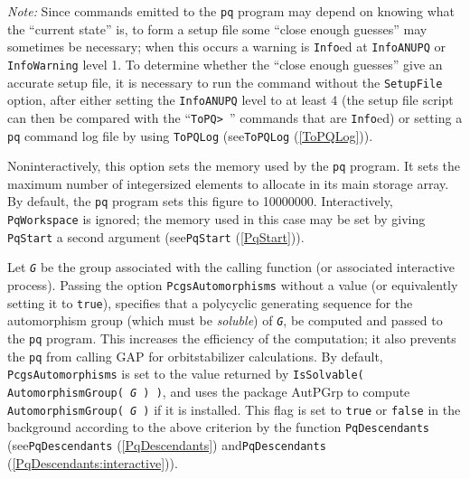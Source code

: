 \documentclass[a4paper,11pt]{report}
\begin{document}
{{\begin{description}
 \emph{Note:} Since commands emitted to the \texttt{pq} program may depend on knowing what the ``current state'' is, to form a setup file some ``close enough guesses'' may sometimes be necessary; when this occurs a warning is \texttt{Info}\texttt{}ed at \texttt{InfoANUPQ} or \texttt{InfoWarning} level 1. To determine whether the ``close enough guesses'' give an accurate setup file, it is necessary to run the command without the \texttt{SetupFile} option, after either setting the \texttt{InfoANUPQ} level to at least 4 (the setup file script can then be compared with the ``\texttt{ToPQ{\textgreater} }'' commands that are \texttt{Info}\texttt{}ed) or setting a \texttt{pq} command log file by using \texttt{ToPQLog} (see{\nobreakspace}\texttt{ToPQLog} (\ref{ToPQLog})). 
\item[{\texttt{PqWorkspace := \mbox{\texttt{\mdseries\slshape workspace}}} \label{option PqWorkspace}\index{option PqWorkspace}}]  Non\texttt{}interactively, this option sets the memory used by the \texttt{pq} program. It sets the maximum number of integer\texttt{}sized
elements to allocate in its main storage array. By default, the \texttt{pq} program sets this figure to 10000000. Interactively, \texttt{PqWorkspace} is ignored; the memory used in this case may be set by giving \texttt{PqStart} a second argument (see{\nobreakspace}\texttt{PqStart} (\ref{PqStart})). 
\item[{\texttt{PcgsAutomorphisms} \label{option PcgsAutomorphisms}\index{option PcgsAutomorphisms}}] 
\item[{\texttt{PcgsAutomorphisms := false}  }]  Let \mbox{\texttt{\mdseries\slshape G}} be the group associated with the calling function (or associated interactive
process). Passing the option \texttt{PcgsAutomorphisms} without a value (or equivalently setting it to \texttt{true}), specifies that a polycyclic generating sequence for the automorphism group
(which must be \emph{soluble}) of \mbox{\texttt{\mdseries\slshape G}}, be computed and passed to the \texttt{pq} program. This increases the efficiency of the computation; it also prevents
the \texttt{pq} from calling \textsf{GAP} for orbit\texttt{}stabilizer calculations. By default, \texttt{PcgsAutomorphisms} is set to the value returned by \texttt{IsSolvable( AutomorphismGroup( \mbox{\texttt{\mdseries\slshape G}} ) )}, and uses the package \textsf{AutPGrp} to compute \texttt{AutomorphismGroup( \mbox{\texttt{\mdseries\slshape G}} )} if it is installed. This flag is set to \texttt{true} or \texttt{false} in the background according to the above criterion by the function \texttt{PqDescendants} (see{\nobreakspace}\texttt{PqDescendants} (\ref{PqDescendants}) and{\nobreakspace}\texttt{PqDescendants} (\ref{PqDescendants:interactive})). 


\end{description}}}
\end{document}
